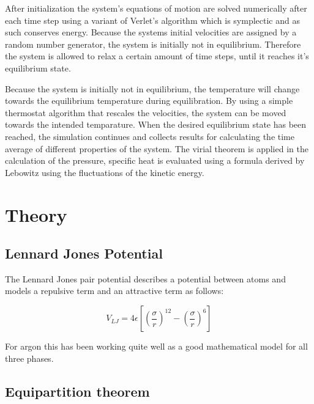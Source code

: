 \documentclass[
10pt, %
a4paper, %
oneside, %
headinclude,footinclude, %
BCOR5mm, %
]{scrartcl}
\begin{document}
After initialization the system's equations of motion are solved numerically after each time step using a variant of Verlet's algorithm which is symplectic and as such conserves energy.  Because the systems initial velocities are assigned by a random number generator, the system is initially not in equilibrium. Therefore the system is allowed to relax a certain amount of time steps, until it reaches it's equilibrium state.

Because the system is initially not in equilibrium, the temperature will change towards the equilibrium temperature during equilibration. By using a simple thermostat algorithm that rescales the velocities, the system can be moved towards the intended temparature. When the desired equilibrium state has been reached, the simulation continues and collects results for calculating the time average of different properties of the system. The virial theorem is applied in the calculation of the pressure, specific heat is evaluated using a formula derived by Lebowitz using the fluctuations of the kinetic energy\cite{Duane:1985lz}.

 
\newpage

\section{Theory}








\subsection{Lennard Jones Potential}

The Lennard Jones pair potential describes a potential between atoms and models a repulsive term and an attractive term as follows:

$$ V_{LJ} =  4 \epsilon \left [ \left (\frac{\sigma}{r} \right )^{12} - \left ( \frac{\sigma}{r} \right )^6 \right ] $$

For argon this has been working quite well as a good mathematical model for all three phases\cite{Rahman}. 
 
 
 \subsection{Equipartition theorem}
 
\end{document}
